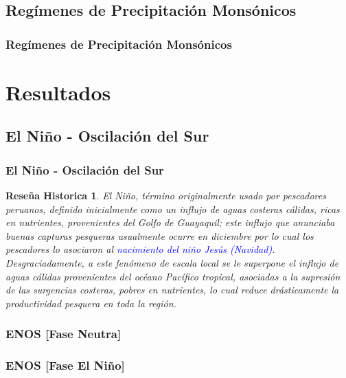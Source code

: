 \documentclass{beamer}
\newtheorem{Th1}{Reseña Historica}
\begin{document}
	\subsection{Regímenes de Precipitación Monsónicos}
	\begin{frame}
		\frametitle{Regímenes de Precipitación Monsónicos}
		\begin{figure}[!hbt]
		   \centering
		\end{figure}
	\end{frame}

	\section{Resultados}
	\subsection{El Niño - Oscilación del Sur}
	\begin{frame}
		\frametitle{El Niño - Oscilación del Sur}
		\begin{Th1}
		El Niño, término originalmente usado por pescadores peruanos, definido inicialmente como un influjo de aguas costeras cálidas, ricas en nutrientes, provenientes del Golfo de Guayaquil; este influjo que anunciaba buenas capturas pesqueras usualmente ocurre en diciembre por lo cual los pescadores lo asociaron al \textcolor{blue}{nacimiento del niño Jesús (Navidad)}. Desgraciadamente, a este fenómeno de escala local se le superpone el influjo de aguas cálidas provenientes del océano Pacífico tropical, asociadas a la supresión de las surgencias costeras, pobres en nutrientes, lo cual reduce drásticamente la productividad pesquera en toda la región.
		\end{Th1}
	\end{frame} 

	\begin{frame}
		\frametitle{ENOS [Fase Neutra]}
		\begin{figure}[!hbt]
		   \centering
		\end{figure}
	\end{frame}

	\begin{frame}
		\frametitle{ENOS [Fase El Niño]}
		\begin{figure}[!hbt]
		   \centering
		\end{figure}
	\end{frame}
\end{document}

